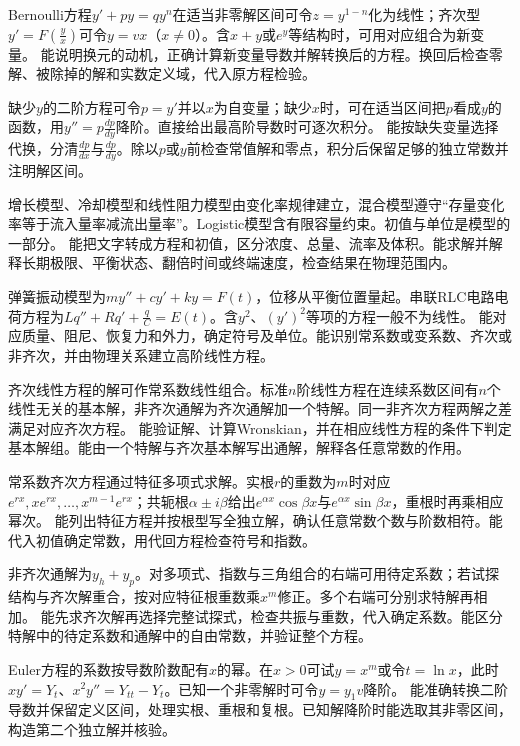 {Bernoulli方程$y'+py=qy^n$在适当非零解区间可令$z=y^{1-n}$化为线性；齐次型$y'=F(\frac yx)$可令$y=vx$（$x\ne0$）。含$x+y$或$e^y$等结构时，可用对应组合为新变量。}
{能说明换元的动机，正确计算新变量导数并解转换后的方程。换回后检查零解、被除掉的解和实数定义域，代入原方程检验。}

{缺少$y$的二阶方程可令$p=y'$并以$x$为自变量；缺少$x$时，可在适当区间把$p$看成$y$的函数，用$y''=p\frac{dp}{dy}$降阶。直接给出最高阶导数时可逐次积分。}
{能按缺失变量选择代换，分清$\frac{dp}{dx}$与$\frac{dp}{dy}$。除以$p$或$y$前检查常值解和零点，积分后保留足够的独立常数并注明解区间。}

{增长模型、冷却模型和线性阻力模型由变化率规律建立，混合模型遵守“存量变化率等于流入量率减流出量率”。Logistic模型含有限容量约束。初值与单位是模型的一部分。}
{能把文字转成方程和初值，区分浓度、总量、流率及体积。能求解并解释长期极限、平衡状态、翻倍时间或终端速度，检查结果在物理范围内。}

{弹簧振动模型为$my''+cy'+ky=F(t)$，位移从平衡位置量起。串联RLC电路电荷方程为$Lq''+Rq'+\frac qC=E(t)$。含$y^2$、$(y')^2$等项的方程一般不为线性。}
{能对应质量、阻尼、恢复力和外力，确定符号及单位。能识别常系数或变系数、齐次或非齐次，并由物理关系建立高阶线性方程。}

{齐次线性方程的解可作常系数线性组合。标准$n$阶线性方程在连续系数区间有$n$个线性无关的基本解，非齐次通解为齐次通解加一个特解。同一非齐次方程两解之差满足对应齐次方程。}
{能验证解、计算Wronskian，并在相应线性方程的条件下判定基本解组。能由一个特解与齐次基本解写出通解，解释各任意常数的作用。}

{常系数齐次方程通过特征多项式求解。实根$r$的重数为$m$时对应$e^{rx},xe^{rx},\ldots,x^{m-1}e^{rx}$；共轭根$\alpha\pm i\beta$给出$e^{\alpha x}\cos\beta x$与$e^{\alpha x}\sin\beta x$，重根时再乘相应幂次。}
{能列出特征方程并按根型写全独立解，确认任意常数个数与阶数相符。能代入初值确定常数，用代回方程检查符号和指数。}

{非齐次通解为$y_h+y_p$。对多项式、指数与三角组合的右端可用待定系数；若试探结构与齐次解重合，按对应特征根重数乘$x^m$修正。多个右端可分别求特解再相加。}
{能先求齐次解再选择完整试探式，检查共振与重数，代入确定系数。能区分特解中的待定系数和通解中的自由常数，并验证整个方程。}

{Euler方程的系数按导数阶数配有$x$的幂。在$x>0$可试$y=x^m$或令$t=\ln x$，此时$xy'=Y_t$、$x^2y''=Y_{tt}-Y_t$。已知一个非零解时可令$y=y_1v$降阶。}
{能准确转换二阶导数并保留定义区间，处理实根、重根和复根。已知解降阶时能选取其非零区间，构造第二个独立解并核验。}

